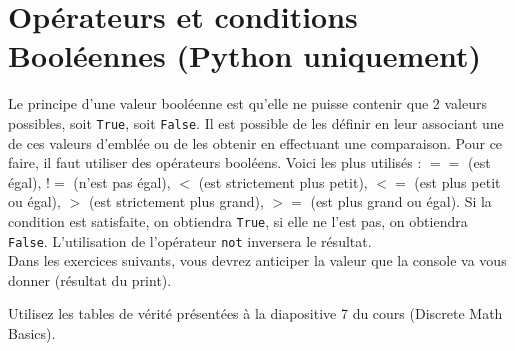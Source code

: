 \newpage
\section{Opérateurs et conditions Booléennes (Python uniquement)}
Le principe d'une valeur booléenne est qu'elle ne puisse contenir que 2 valeurs possibles, soit \lstinline{True}, soit \lstinline{False}. Il est possible de les définir en leur associant une de ces valeurs d'emblée ou de les obtenir en effectuant une comparaison. Pour ce faire, il faut utiliser des opérateurs booléens. Voici les plus utilisés : $==$ (est égal), $!=$ (n'est pas égal), $<$ (est strictement plus petit), $<=$ (est plus petit ou égal), $>$ (est strictement plus grand), $>=$ (est plus grand ou égal). Si la condition est satisfaite, on obtiendra \lstinline{True}, si elle ne l'est pas, on obtiendra \lstinline{False}. L'utilisation de l'opérateur \lstinline{not} inversera le résultat.\\

Dans les exercices suivants, vous devrez anticiper la valeur que la console va vous donner (résultat du print). \\

\begin{conseil}
	Utilisez les tables de vérité présentées à la diapositive 7 du cours (Discrete Math Basics).
\end{conseil}



